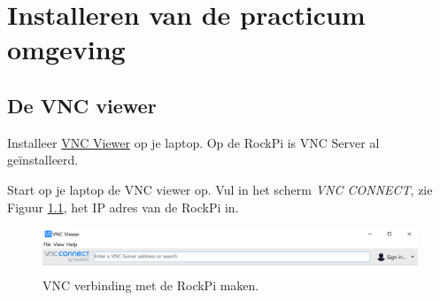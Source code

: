 \chapter{Installeren van de practicum omgeving} \label{app:instal}


\hypertarget{chp:vnc}{}
\section{De VNC viewer}
\label{sec:vnc}
Installeer \href{https://www.realvnc.com/en/connect/download/viewer/}{VNC Viewer} op je laptop. Op de RockPi is VNC Server al geïnstalleerd.

Start op je laptop de VNC viewer op. Vul in het scherm \textit{VNC CONNECT}, zie Figuur \ref{fig:winvnc}, het IP adres van de RockPi in.
\begin{figure}[h!]
	\captionsetup{justification=centering}
	\includegraphics[width=1 \linewidth]{figuren/vncopstart}
	\centering
	\caption{VNC verbinding met de RockPi  maken.}
	\label{fig:winvnc}
\end{figure}
